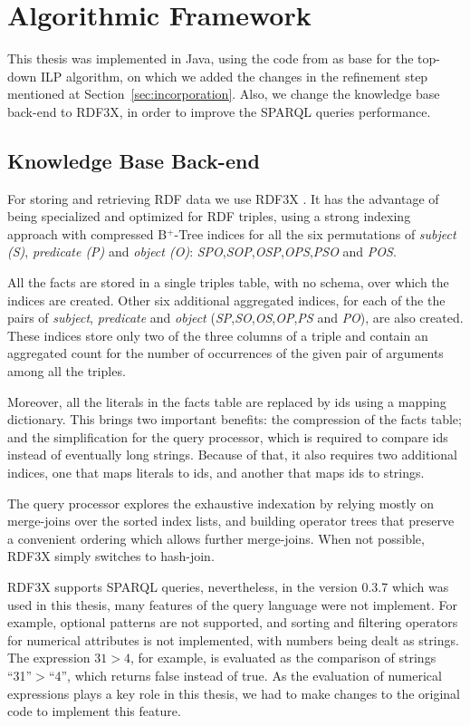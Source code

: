 \section{Algorithmic Framework}
\label{af:intro}

This thesis was implemented in Java, using the code from \citet{Teflioudi2011} as base for the top-down ILP
algorithm, on which we added the changes in the refinement step mentioned at Section~\ref{sec:incorporation}. Also, we
change the knowledge base back-end to RDF3X, in order to improve the SPARQL queries performance.

\subsection{Knowledge Base Back-end}

For storing and retrieving RDF data we use RDF3X \citep{Neumann:2010:RES:1731351.1731354}. It has the advantage of being
specialized and optimized for RDF triples, using a strong indexing approach with compressed B$^+$-Tree indices for all
the six permutations of \emph{subject (S)}, \emph{predicate (P)} and \emph{object (O)}:
\emph{SPO},\emph{SOP},\emph{OSP},\emph{OPS},\emph{PSO} and \emph{POS}.

All the facts are stored in a single triples table, with no schema, over which the indices are created. Other six
additional aggregated indices, for each of the the pairs of \emph{subject}, \emph{predicate} and \emph{object}
(\emph{SP},\emph{SO},\emph{OS},\emph{OP},\emph{PS} and \emph{PO}), are also created. These indices store only two of the
three columns of a triple and contain an aggregated count for the number of occurrences of the given pair of arguments
among all the triples.

Moreover, all the literals in the facts table are replaced by ids using a mapping dictionary. This brings two important
benefits: the compression of the facts table; and the simplification for the query processor, which is required to
compare ids instead of eventually long strings. Because of that, it also requires two additional indices, one that maps
literals to ids, and another that maps ids to strings.

The query processor explores the exhaustive indexation by relying mostly on merge-joins over the sorted index lists, and
building operator trees that preserve a convenient ordering which allows further merge-joins. When not possible,
RDF3X simply switches to hash-join.

RDF3X supports SPARQL queries, nevertheless, in the version 0.3.7 which was used in this thesis, many features of the
query language were not implement. For example, optional patterns are not supported, and sorting and filtering
operators for numerical attributes is not implemented, with numbers being dealt as strings. The expression $31>4$,
for example, is evaluated as the comparison of strings ``31''$>$``4'', which returns false instead of true. As the
evaluation of numerical expressions plays a key role in this thesis, we had to make changes to the original code
to implement this feature.


